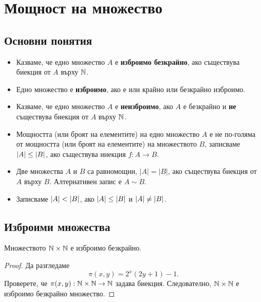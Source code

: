 \chapter{Мощност на множество}


\section{Основни понятия}

\begin{itemize}
\item 
  Казваме, че едно множество $A$ е {\bf изброимо безкрайно}, ако съществува 
  биекция от $A$ върху $\mathbb{N}$.
\item
  Едно множество е {\bf изброимо}, ако е или крайно или безкрайно изброимо.
\item
  Казваме, че едно множество $A$ е {\bf неизброимо}, ако $A$ е безкрайно и {\bf не} съществува 
  биекция от $A$ върху $\mathbb{N}$.
\item
  Мощността (или броят на елементите) на едно множество $A$ е не по-голяма от мощността (или броят на елементите) на множеството $B$, 
  записваме $\lvert{A}\rvert \leq \lvert{B}\rvert$,
  ако съществува инекция $f:A \to B$.
\item
  Две множества $A$ и $B$ са равномощни, $|A| = |B|$, ако съществува биекция от $A$ върху $B$.
  Алтернативен запис е $A \sim B$.
\item
  Записваме $\lvert{A}\rvert < \lvert{B}\rvert$, ако $\lvert{A}\rvert \leq \lvert{B}\rvert$ и $\lvert{A}\rvert \neq \lvert{B}\rvert$.
\end{itemize}

\section{Изброими множества}

\begin{prop}
  Множеството $\mathbb{N}\times\mathbb{N}$ е изброимо безкрайно.
\end{prop}
\begin{proof}
  Да разгледаме
  \[\pi(x,y) = 2^x(2y+1)-1.\]
  Проверете, че $\pi(x,y):\mathbb{N}\times\mathbb{N}\to\mathbb{N}$ задава биекция.
  Следователно, $\mathbb{N}\times\mathbb{N}$ е изброимо безкрайно множество.
\end{proof}


